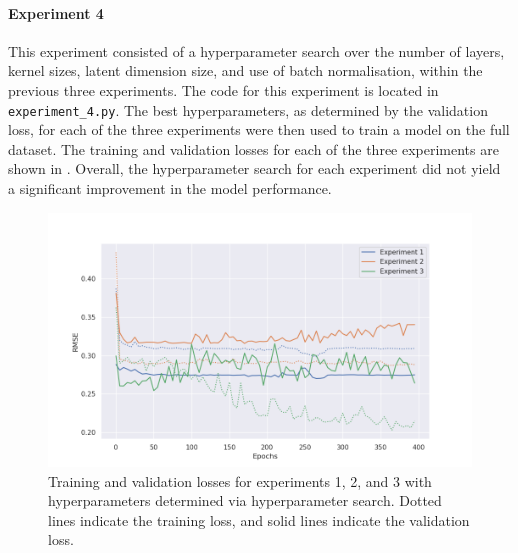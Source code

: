 \documentclass[twocolumn, 9pt]{extarticle}
\begin{document}
\paragraph{Experiment 4} This experiment consisted of a hyperparameter search over the number of layers, kernel sizes, latent dimension size, and use of batch normalisation, within the previous three experiments. The code for this experiment is located in \texttt{experiment\_4.py}. The best hyperparameters, as determined by the validation loss, for each of the three experiments were then used to train a model on the full dataset. The training and validation losses for each of the three experiments are shown in . Overall, the hyperparameter search for each experiment did not yield a significant improvement in the model performance.

\begin{figure}
  \centering
  \includegraphics[width=\columnwidth]{cnn_autoencoder_experiments_4.png}
  \caption{Training and validation losses for experiments 1, 2, and 3 with hyperparameters determined via hyperparameter search. Dotted lines indicate the training loss, and solid lines indicate the validation loss.}
  \label{fig:losses_cnn_hparams}
\end{figure}


\end{document}

